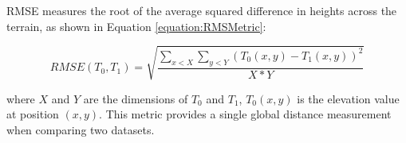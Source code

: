 RMSE measures the root of the average squared difference in heights across the terrain, as shown in Equation \ref{equation:RMSMetric}:

\begin{equation}
\label{equation:RMSMetric}
  RMSE\left(T_{0}, T_{1}\right) = \sqrt{ \dfrac{\displaystyle\sum_{x < X} \displaystyle\sum_{y < Y} { \left( T_{0}\left(x,y\right) - T_{1}\left(x,y\right) \right)^2 } }{ X * Y } }
\end{equation}

\noindent where $X$ and $Y$ are the dimensions of $T_{0}$ and $T_{1}$, $T_{0}\left(x, y\right)$ is the elevation value at position $\left(x, y\right)$.
This metric provides a single global distance measurement when comparing two datasets.

% 
% 

